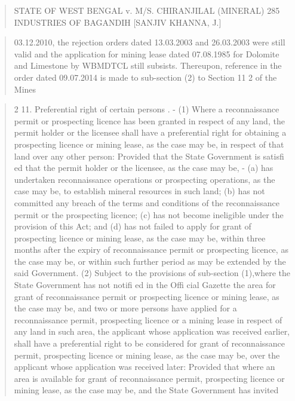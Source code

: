 \documentclass[12pt,a4paper]{article}
\newenvironment{judgequote}
  {\begin{quote}\small}
  {\end{quote}}
\begin{document}

\begin{judgequote}
STATE OF WEST BENGAL v. M/S. CHIRANJILAL (MINERAL) 285
INDUSTRIES OF BAGANDIH [SANJIV KHANNA, J.]
\end{judgequote}

\begin{judgequote}
03.12.2010, the rejection orders dated 13.03.2003 and 26.03.2003 were still
valid and the application for mining lease dated 07.08.1985 for Dolomite
and Limestone by WBMDTCL still subsists. Thereupon, reference in the
order dated 09.07.2014 is made to sub-section (2) to Section 11 2 of the Mines
\end{judgequote}

\begin{judgequote}
2 11. Preferential right of certain persons . - (1) Where a reconnaissance permit
or prospecting licence has been granted in respect of any land, the permit holder or the
licensee shall have a preferential right for obtaining a prospecting licence or mining lease,
as the case may be, in respect of that land over any other person:
Provided that the State Government is satisfi ed that the permit holder or the licensee, as the
case may be, -
(a) has undertaken reconnaissance operations or prospecting operations, as the case may be,
to establish mineral resources in such land;
(b) has not committed any breach of the terms and conditions of the reconnaissance permit
or the prospecting licence;
(c) has not become ineligible under the provision of this Act; and
(d) has not failed to apply for grant of prospecting licence or mining lease, as the case may
be, within three months after the expiry of reconnaissance permit or prospecting licence, as
the case may be, or within such further period as may be extended by the said Government.
(2) Subject to the provisions of sub-section (1),where the State Government has not
notifi ed in the Offi cial Gazette the area for grant of reconnaissance permit or prospecting
licence or mining lease, as the case may be, and two or more persons have applied for a
reconnaissance permit, prospecting licence or a mining lease in respect of any land in such
area, the applicant whose application was received earlier, shall have a preferential right to
be considered for grant of reconnaissance permit, prospecting licence or mining lease, as
the case may be, over the applicant whose application was received later:
Provided that where an area is available for grant of reconnaissance permit, prospecting
licence or mining lease, as the case may be, and the State Government has invited

\end{judgequote}
\end{document}

